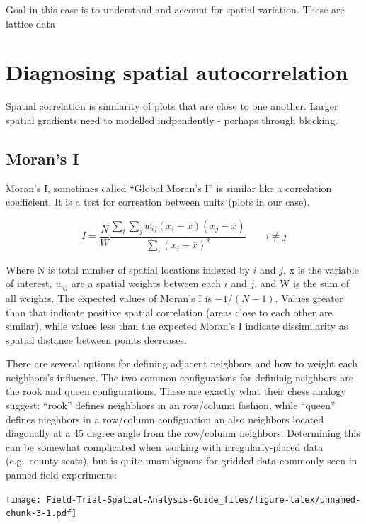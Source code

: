 \documentclass[]{book}
\begin{document}
Goal in this case is to understand and account for spatial variation. These are lattice data

\hypertarget{diagnosing-spatial-autocorrelation}{%
\section{Diagnosing spatial autocorrelation}\label{diagnosing-spatial-autocorrelation}}

Spatial correlation is similarity of plots that are close to one another. Larger spatial gradients need to modelled indpendently - perhaps through blocking.

\hypertarget{morans-i}{%
\subsection{Moran's I}\label{morans-i}}

Moran's I, sometimes called ``Global Moran's I'' is similar like a correlation coefficient. It is a test for correation between units (plots in our case).

\[ I = \frac{N}{W}\frac{\sum_i \sum_j w_{ij} (x_i - \bar{x})(x_j - \bar{x})}{\sum_i(x_i - \bar{x})^2} 
\qquad i \neq j\]

Where N is total number of spatial locations indexed by \(i\) and \(j\), x is the variable of interest, \(w_{ij}\) are a spatial weights between each \(i\) and \(j\), and W is the sum of all weights. The expected values of Moran's I is \(-1/(N-1)\). Values greater than that indicate positive spatial correlation (areas close to each other are similar), while values less than the expected Moran's I indicate dissimilarity as spatial distance between points decreases.

There are several options for defining adjacent neighbors and how to weight each neighbors's influence. The two common configuations for defininig neighbors are the rook and queen configurations. These are exactly what their chess analogy suggest: ``rook'' defines neighbhors in an row/column fashion, while ``queen'' defines nieghbors in a row/column configuation an also neighbors located diagonally at a 45 degree angle from the row/column neighbors. Determining this can be somewhat complicated when working with irregularly-placed data (e.g.~county seats), but is quite unambiguous for gridded data commonly seen in panned field experiments:

\texttt{[image: Field-Trial-Spatial-Analysis-Guide\_files/figure-latex/unnamed-chunk-3-1.pdf]}
\end{document}
